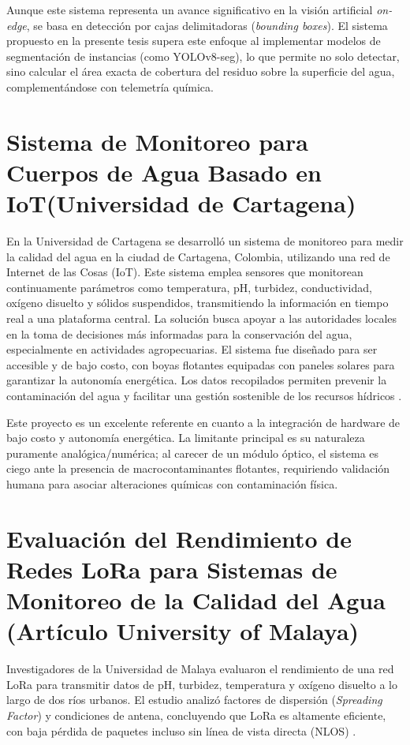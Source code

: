 Aunque este sistema representa un avance significativo en la visión artificial \textit{on-edge}, se basa en detección por cajas delimitadoras (\textit{bounding boxes}). El sistema propuesto en la presente tesis supera este enfoque al implementar modelos de segmentación de instancias (como YOLOv8-seg), lo que permite no solo detectar, sino calcular el área exacta de cobertura del residuo sobre la superficie del agua, complementándose con telemetría química.

\section{Sistema de Monitoreo para Cuerpos de Agua Basado en IoT(Universidad de Cartagena)}

En la Universidad de Cartagena se desarrolló un sistema de monitoreo para medir la calidad del agua en la ciudad de Cartagena, Colombia, utilizando una red de Internet de las Cosas (IoT). Este sistema emplea sensores que monitorean continuamente parámetros como temperatura, pH, turbidez, conductividad, oxígeno disuelto y sólidos suspendidos, transmitiendo la información en tiempo real a una plataforma central. La solución busca apoyar a las autoridades locales en la toma de decisiones más informadas para la conservación del agua, especialmente en actividades agropecuarias. El sistema fue diseñado para ser accesible y de bajo costo, con boyas flotantes equipadas con paneles solares para garantizar la autonomía energética. Los datos recopilados permiten prevenir la contaminación del agua y facilitar una gestión sostenible de los recursos hídricos \cite{lechuga2023}.

Este proyecto es un excelente referente en cuanto a la integración de hardware de bajo costo y autonomía energética. La limitante principal es su naturaleza puramente analógica/numérica; al carecer de un módulo óptico, el sistema es ciego ante la presencia de macrocontaminantes flotantes, requiriendo validación humana para asociar alteraciones químicas con contaminación física.

\section{Evaluación del Rendimiento de Redes LoRa para Sistemas de Monitoreo de la Calidad del Agua (Artículo University of Malaya)}

Investigadores de la Universidad de Malaya evaluaron el rendimiento de una red LoRa para transmitir datos de pH, turbidez, temperatura y oxígeno disuelto a lo largo de dos ríos urbanos. El estudio analizó factores de dispersión (\textit{Spreading Factor}) y condiciones de antena, concluyendo que LoRa es altamente eficiente, con baja pérdida de paquetes incluso sin línea de vista directa (NLOS) \cite{syed2024}.


